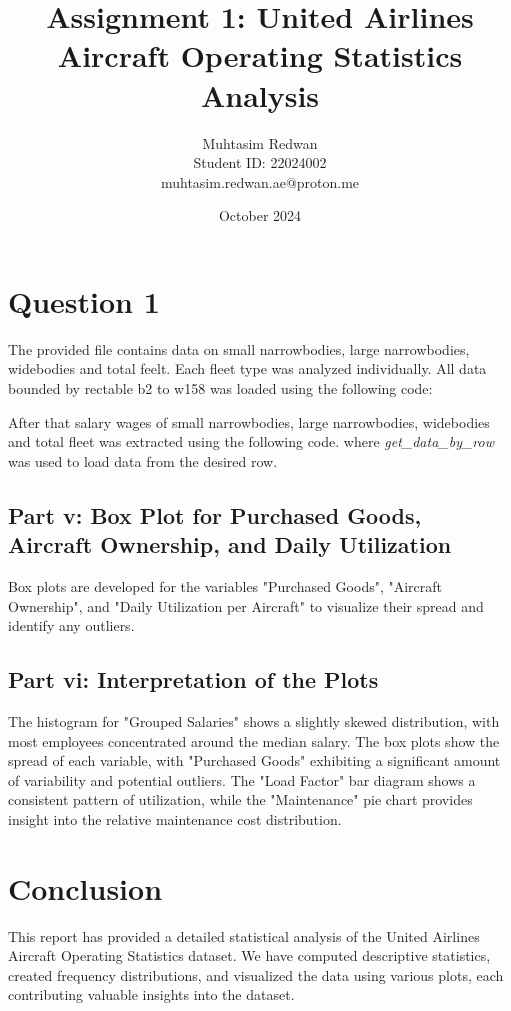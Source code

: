 \documentclass[a4paper,12pt]{article}
\title{Assignment 1: United Airlines Aircraft Operating Statistics Analysis}
\author{Muhtasim Redwan \\ Student ID: 22024002 \\ muhtasim.redwan.ae@proton.me}
\date{October 2024}
\begin{document}
\maketitle




\section{Question 1}
The provided file contains data on small narrowbodies, large narrowbodies, widebodies and total feelt. Each fleet
type was analyzed individually. All data bounded by rectable b2 to w158 was loaded using the following code:


After that salary wages of small narrowbodies, large narrowbodies, widebodies and total fleet was extracted using the following code. where \textit{get\_data\_by\_row} was used to load data from the desired row.






\subsection{Part v: Box Plot for Purchased Goods, Aircraft Ownership, and Daily Utilization}
Box plots are developed for the variables "Purchased Goods", "Aircraft Ownership", and "Daily Utilization per Aircraft" to visualize their spread and identify any outliers.

\subsection{Part vi: Interpretation of the Plots}
The histogram for "Grouped Salaries" shows a slightly skewed distribution, with most employees concentrated around the median salary. The box plots show the spread of each variable, with "Purchased Goods" exhibiting a significant amount of variability and potential outliers. The "Load Factor" bar diagram shows a consistent pattern of utilization, while the "Maintenance" pie chart provides insight into the relative maintenance cost distribution.

\section*{Conclusion}
This report has provided a detailed statistical analysis of the United Airlines Aircraft Operating Statistics dataset. We have computed descriptive statistics, created frequency distributions, and visualized the data using various plots, each contributing valuable insights into the dataset.
\end{document}
